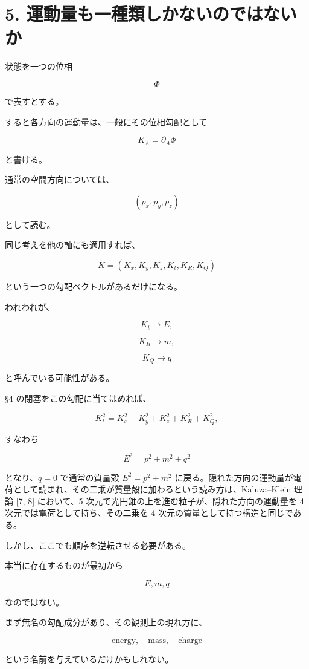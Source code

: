 \documentclass[
  a4paper,
]{ltjsarticle}
\begin{document}
\section{5.
運動量も一種類しかないのではないか}\label{ux904bux52d5ux91cfux3082ux4e00ux7a2eux985eux3057ux304bux306aux3044ux306eux3067ux306fux306aux3044ux304b}

状態を一つの位相

\[
\Phi
\]

で表すとする。

すると各方向の運動量は、一般にその位相勾配として

\[
K_A=\partial_A\Phi
\]

と書ける。

通常の空間方向については、

\[
(p_x,p_y,p_z)
\]

として読む。

同じ考えを他の軸にも適用すれば、

\[
K=
(K_x,K_y,K_z,K_t,K_R,K_Q)
\]

という一つの勾配ベクトルがあるだけになる。

われわれが、

\[
K_t\rightarrow E,
\]

\[
K_R\rightarrow m,
\]

\[
K_Q\rightarrow q
\]

と呼んでいる可能性がある。

§4 の閉塞をこの勾配に当てはめれば、

\[
K_t^2=K_x^2+K_y^2+K_z^2+K_R^2+K_Q^2,
\]

すなわち

\[
E^2=p^2+m^2+q^2
\]

となり、\(q=0\) で通常の質量殻 \(E^2=p^2+m^2\)
に戻る。隠れた方向の運動量が電荷として読まれ、その二乗が質量殻に加わるという読み方は、Kaluza--Klein
理論 {[}7, 8{]} において、5
次元で光円錐の上を進む粒子が、隠れた方向の運動量を 4
次元では電荷として持ち、その二乗を 4
次元の質量として持つ構造と同じである。

しかし、ここでも順序を逆転させる必要がある。

本当に存在するものが最初から

\[
E,m,q
\]

なのではない。

まず無名の勾配成分があり、その観測上の現れ方に、

\[
\text{energy},
\quad
\text{mass},
\quad
\text{charge}
\]

という名前を与えているだけかもしれない。
\end{document}

